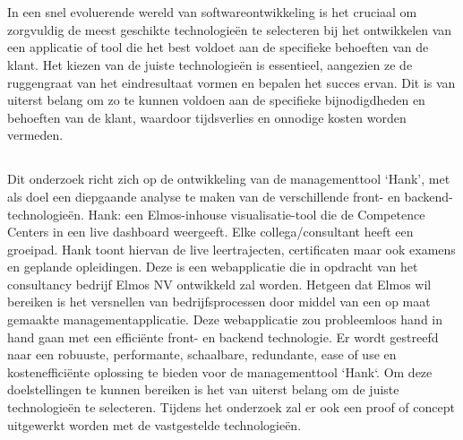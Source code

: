 
\chapter{}%
\label{ch:inleiding}

In een snel evoluerende wereld van softwareontwikkeling is het cruciaal om
zorgvuldig de meest geschikte technologieën te selecteren bij het ontwikkelen
van een applicatie of tool die het best voldoet aan de specifieke behoeften van
de klant. Het kiezen van de juiste technologieën is essentieel, aangezien ze de
ruggengraat van het eindresultaat vormen en bepalen het succes ervan. Dit is
van uiterst belang om zo te kunnen voldoen aan de specifieke bijnodigdheden en
behoeften van de klant, waardoor tijdsverlies en onnodige kosten worden
vermeden.
\section{}%
\label{sec:probleemstelling}
Dit onderzoek richt zich op de ontwikkeling van de managementtool `Hank', met
als doel een diepgaande analyse te maken van de verschillende front- en
backend-technologieën. Hank: een Elmos-inhouse visualisatie-tool die de
Competence Centers in een live dashboard weergeeft. Elke collega/consultant
heeft een groeipad. Hank toont hiervan de live leertrajecten,
cer\-ti\-fi\-caten maar ook ex\-amens en geplande opleidingen. Deze is een
webapplicatie die in opdracht van het consultancy bedrijf Elmos NV ontwikkeld
zal worden. Hetgeen dat Elmos wil bereiken is het versnellen van
bedrijfsprocessen door middel van een op maat gemaakte managementapplicatie.
Deze webapplicatie zou probleemloos hand in hand gaan met een efficiënte front-
en backend technologie. \bigbreak Er wordt gestreefd naar een robuuste,
performante, schaalbare, redundante, ease of use en kostenefficiënte oplossing
te bieden voor de managementtool `Hank`. Om deze doelstellingen te kunnen
bereiken is het van uiterst belang om de juiste technologieën te selecteren.
Tijdens het onderzoek zal er ook een proof of concept uitgewerkt worden met de
vastgestelde technologieën.

\section{}%
\label{sec:onderzoeksvraag}


